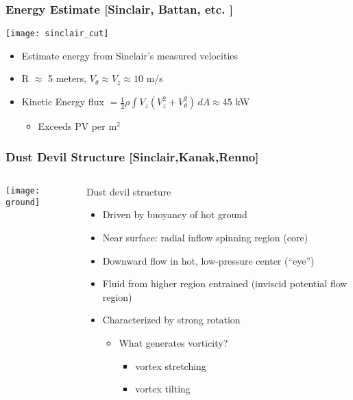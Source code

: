 \documentclass[mathserif]{beamer}
\newcommand{\myred}[1]{{\color{red} #1}}
\begin{document}
%
%
%
\begin{frame}
\frametitle{Energy Estimate [Sinclair, Battan, etc. ]}

   \begin{center}
    \texttt{[image: sinclair\_cut]}
   \end{center}

\begin{itemize}
  \item Estimate energy from Sinclair's measured velocities 
  \item R $\approx$ 5 meters, $V_{\theta} \approx V_{z} \approx 10$ m/s 
  \item Kinetic Energy flux $ = \frac{1}{2}\rho \int V_z (V_z^2 + V_{\theta}^2)
	\, dA \approx 45$ kW
 \begin{itemize}
  \item Exceeds PV per $\text{m}^2$
 \end{itemize}
\end{itemize}

\end{frame}

\begin{frame}
\frametitle{Dust Devil Structure [Sinclair,Kanak,Renno]}

\begin{columns}[]
  \begin{column}{0.45\linewidth}
   \begin{center}
    \texttt{[image: ground]}
   \end{center}
  \end{column}
  \begin{column}{0.55\linewidth}
    \begin{block}{Dust devil structure}
    \begin{itemize}
     \item Driven by buoyancy of hot ground
     \item Near surface: radial inflow spinning region (core) 
     \item Downward flow in \myred{hot}, low-pressure  center (``eye'')
     \item Fluid from higher region entrained (inviscid potential flow region)
     \item Characterized by strong rotation
     \begin{itemize}
      \item What generates vorticity?
        \begin{itemize}
        \item vortex stretching
        \item vortex tilting
          \end{itemize}
     \end{itemize}
    \end{itemize}
   \end{block}
  \end{column}
\end{columns}

\end{frame}
\end{document}
